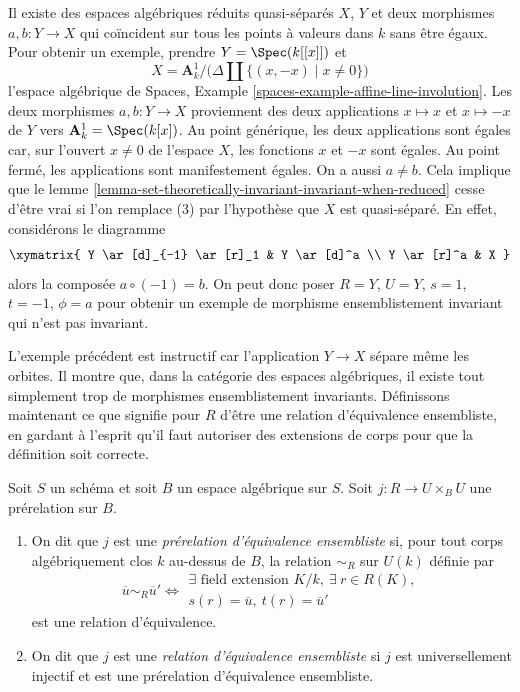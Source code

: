 \begin{example}
\label{example-not-invariant}
Il existe des espaces algébriques réduits quasi-séparés $X$, $Y$ et deux
morphismes $a, b : Y \to X$ qui coïncident sur tous les points à valeurs dans $k$ sans être
égaux. Pour obtenir un exemple, prendre $Y = \Spec(k[[x]])$ et
$$
X = \mathbf{A}^1_k \Big/ \big(\Delta \amalg \{(x, -x) \mid x \not = 0\}\big)
$$
l'espace algébrique de
Spaces, Example \ref{spaces-example-affine-line-involution}.
Les deux morphismes $a, b : Y \to X$
proviennent des deux applications $x \mapsto x$ et $x \mapsto -x$
de $Y$ vers $\mathbf{A}^1_k = \Spec(k[x])$. Au point générique,
les deux applications sont égales car, sur l'ouvert $x \not = 0$ de l'espace
$X$, les fonctions $x$ et $-x$ sont égales. Au point fermé,
les applications sont manifestement égales. On a aussi $a \not = b$.
Cela implique que le
lemme \ref{lemma-set-theoretically-invariant-invariant-when-reduced}
cesse d'être vrai si l'on remplace (3) par l'hypothèse que $X$
est quasi-séparé. En effet, considérons le diagramme
$$
\xymatrix{
Y \ar[d]_{-1} \ar[r]_1 & Y \ar[d]^a \\
Y \ar[r]^a & X
}
$$
alors la composée $a \circ (-1) = b$. On peut donc poser $R = Y$,
$U = Y$, $s = 1$, $t = -1$, $\phi = a$ pour obtenir un exemple de morphisme
ensemblistement invariant qui n'est pas invariant.
\end{example}

\noindent
L'exemple précédent est instructif car l'application $Y \to X$ sépare même
les orbites. Il montre que, dans la catégorie des espaces algébriques, il existe tout
simplement trop de morphismes ensemblistement invariants. Définissons maintenant
ce que signifie pour $R$ d'être une relation d'équivalence ensembliste, en gardant
à l'esprit qu'il faut autoriser des extensions de corps pour que la définition
soit correcte.

\begin{definition}
\label{definition-set-theoretic-equivalence}
Soit $S$ un schéma et soit $B$ un espace algébrique sur $S$.
Soit $j : R \to U \times_B U$ une prérelation sur $B$.
\begin{enumerate}
\item On dit que $j$ est une {\it prérelation d'équivalence ensembliste} si,
pour tout corps algébriquement clos $k$ au-dessus de $B$, la relation
$\sim_R$ sur $U(k)$ définie par
$$
\overline{u} \sim_R \overline{u}'
\Leftrightarrow
\begin{matrix}
\exists\text{ field extension }K/k, \ \exists\ r \in R(K), \\
s(r) = \overline{u}, \ t(r) = \overline{u}'
\end{matrix}
$$
est une relation d'équivalence.
\item On dit que $j$ est une {\it relation d'équivalence ensembliste}
si $j$ est universellement injectif et est une prérelation d'équivalence
ensembliste.
\end{enumerate}
\end{definition}

